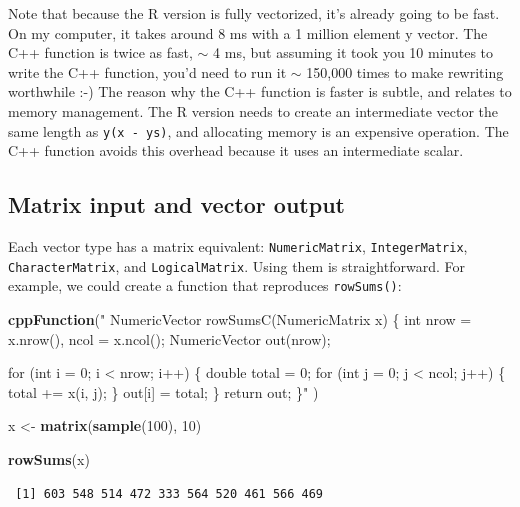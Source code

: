 \documentclass[
]{krantz}
\makeatletter
\newenvironment{Shaded}{\begin{snugshade}}{\end{snugshade}}
\newcommand{\DecValTok}[1]{\textcolor[rgb]{0.06,0.06,0.06}{#1}}
\newcommand{\KeywordTok}[1]{\textcolor[rgb]{0.27,0.27,0.27}{\textbf{#1}}}
\newcommand{\NormalTok}[1]{#1}
\newcommand{\StringTok}[1]{\textcolor[rgb]{0.5,0.5,0.5}{#1}}
\newenvironment{kframe}{%
\medskip{}
\setlength{\fboxsep}{.8em}
 \def\at@end@of@kframe{}%
 \ifinner\ifhmode%
  \def\at@end@of@kframe{\end{minipage}}%
  \begin{minipage}{\columnwidth}%
 \fi\fi%
 \def\FrameCommand##1{\hskip\@totalleftmargin \hskip-\fboxsep
 \colorbox{shadecolor}{##1}\hskip-\fboxsep
     \hskip-\linewidth \hskip-\@totalleftmargin \hskip\columnwidth}%
 \MakeFramed {\advance\hsize-\width
   \@totalleftmargin\z@ \linewidth\hsize
   \@setminipage}}%
 {\par\unskip\endMakeFramed%
 \at@end@of@kframe}
\renewenvironment{Shaded}{\begin{kframe}}{\end{kframe}}
\makeatother
\begin{document}
Note that because the R version is fully vectorized, it's already going to be fast. On my computer, it takes around 8 ms with a 1 million element y vector. The C++ function is twice as fast, \(\sim\) 4 ms, but assuming it took you 10 minutes to write the C++ function, you'd need to run it \(\sim\) 150,000 times to make rewriting worthwhile :-) The reason why the C++ function is faster is subtle, and relates to memory management. The R version needs to create an intermediate vector the same length as \texttt{y(x\ -\ ys)}, and allocating memory is an expensive operation. The C++ function avoids this overhead because it uses an intermediate scalar.

\hypertarget{matrix-input-and-vector-output}{%
\subsection{Matrix input and vector output}\label{matrix-input-and-vector-output}}

Each vector type has a matrix equivalent: \texttt{NumericMatrix}, \texttt{IntegerMatrix}, \texttt{CharacterMatrix}, and \texttt{LogicalMatrix}. Using them is straightforward. For example, we could create a function that reproduces \texttt{rowSums()}:

\begin{Shaded}
\begin{Highlighting}[]
\KeywordTok{cppFunction}\NormalTok{(}\StringTok{"}
\StringTok{  NumericVector rowSumsC(NumericMatrix x) \{}
\StringTok{    int nrow = x.nrow(), ncol = x.ncol();}
\StringTok{    NumericVector out(nrow);}

\StringTok{    for (int i = 0; i \textless{} nrow; i++) \{}
\StringTok{      double total = 0;}
\StringTok{      for (int j = 0; j \textless{} ncol; j++) \{}
\StringTok{        total += x(i, j);}
\StringTok{      \}}
\StringTok{      out[i] = total;}
\StringTok{    \}}
\StringTok{    return out;}
\StringTok{  \}"}
\NormalTok{)}

\NormalTok{x \textless{}{-}}\StringTok{ }\KeywordTok{matrix}\NormalTok{(}\KeywordTok{sample}\NormalTok{(}\DecValTok{100}\NormalTok{), }\DecValTok{10}\NormalTok{)}

\KeywordTok{rowSums}\NormalTok{(x)}
\end{Highlighting}
\end{Shaded}

\begin{verbatim}
 [1] 603 548 514 472 333 564 520 461 566 469
\end{verbatim}
\end{document}
